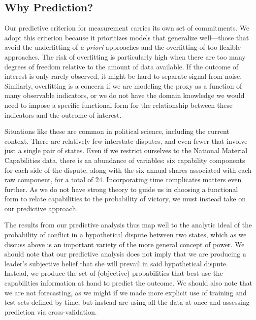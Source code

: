 \subsection{Why Prediction?}

Our predictive criterion for measurement carries its own set of commitments.
We adopt this criterion because it prioritizes models that generalize well---those that avoid the underfitting of \emph{a priori} approaches and the overfitting of too-flexible approaches.
The risk of overfitting is particularly high when there are too many degrees of freedom relative to the amount of data available.
If the outcome of interest is only rarely observed, it might be hard to separate signal from noise.
Similarly, overfitting is a concern if we are modeling the proxy as a function of many observable indicators, or we do not have the domain knowledge we would need to impose a specific functional form for the relationship between these indicators and the outcome of interest.

Situations like these are common in political science, including the current context.
There are relatively few interstate disputes, and even fewer that involve just a single pair of states.
Even if we restrict ourselves to the National Material Capabilities data, there is an abundance of variables: six capability components for each side of the dispute, along with the six annual shares associated with each raw component, for a total of 24.
Incorporating time complicates matters even further.
As we do not have strong theory to guide us in choosing a functional form to relate capabilities to the probability of victory, we must instead take on our predictive approach.

The results from our predictive analysis thus map well to the analytic ideal of the probability of conflict in a hypothetical dispute between two states, which as we discuss above is an important variety of the more general concept of power.
We should note that our predictive analysis does not imply that we are producing a leader's subjective belief that she will prevail in said hypothetical dispute.
Instead, we produce the set of (objective) probabilities that best use the capabilities information at hand to predict the outcome.
We should also note that we are not forecasting, as we might if we made more explicit use of training and test sets defined by time, but instead are using all the data at once and assessing prediction via cross-validation.

